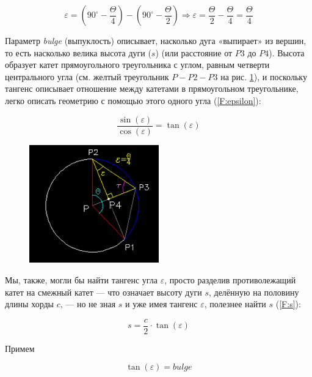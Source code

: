 \begin{equation}
	\varepsilon=(90^{\circ}-\frac{\Theta}{4})-(90^{\circ}-\frac{\Theta}{2})\Rightarrow\varepsilon=\frac{\Theta}{2}-\frac{\Theta}{4}=\frac{\Theta}{4}
	\label{F:epsilon}
\end{equation}

Параметр \textit{bulge} (выпуклость) описывает, насколько дуга «выпирает» из вершин, то есть насколько велика высота дуги ($s$) (или расстояние от $P3$ до $P4$). Высота образует катет прямоугольного треугольника с углом, равным четверти центрального угла (см. желтый треугольник $P-P2-P3$ на рис. \ref{fig:epsilon}), и поскольку тангенс описывает отношение между катетами в прямоугольном треугольнике, легко описать геометрию с помощью этого одного угла (\ref{F:epsilon}):

\begin{equation}
	\frac{\sin(\varepsilon)}{\cos(\varepsilon)}=\tan(\varepsilon)
	\label{F:epsilon}
\end{equation}

\begin{figure}[H]
	\centering
	\includegraphics[width=0.5\textwidth]{figures/epsilon.png}
	\label{fig:epsilon}
\end{figure}

Мы, также, могли бы найти тангенс угла $\varepsilon$, просто разделив противолежащий катет на смежный катет --- что означает высоту дуги $s$, делённую на половину длины хорды $c$, --- но не зная $s$ и уже имея тангенс $\varepsilon$, полезнее найти $s$ (\ref{F:s}):

\begin{equation}
	s=\frac{c}{2}\cdot\tan(\varepsilon)
	\label{F:s}
\end{equation}

Примем

\begin{equation}
	\tan(\varepsilon)=bulge
	\label{F:tanepsilon}
\end{equation}

